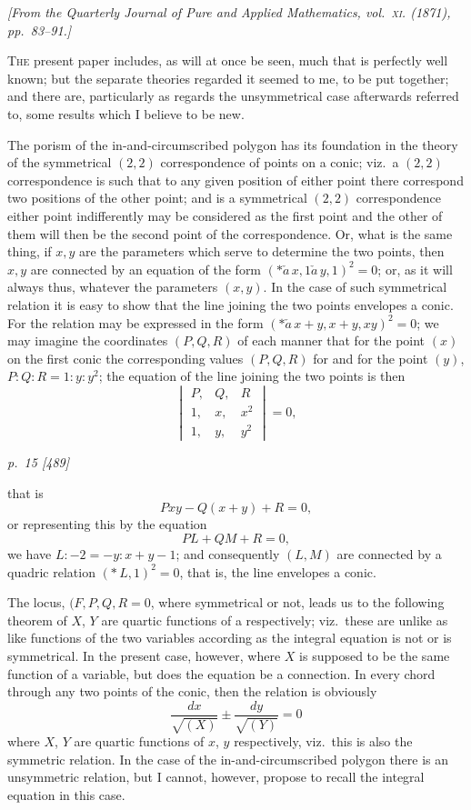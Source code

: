 \documentclass[11pt,a4paper]{article}
\theoremstyle{plain}
\theoremstyle{definition}
\begin{document}
\begin{center}
\textit{[From the Quarterly Journal of Pure and Applied Mathematics, vol.~\textsc{xi}. (1871), pp.~83--91.]}
\end{center}

\textsc{The} present paper includes, as will at once be seen, much that is perfectly well
known; but the separate theories regarded it seemed to me, to be put together; and
there are, particularly as regards the unsymmetrical case afterwards referred to, some results which I believe to be new.

The porism of the in-and-circumscribed polygon has its foundation in the theory
of the symmetrical $(2,2)$ correspondence of points on a conic; viz.\ a $(2,2)$ correspondence is such that to any given position of either point there correspond two
positions of the other point; and is a symmetrical $(2,2)$ correspondence either point
indifferently may be considered as the first point and the other of them will then be
the second point of the correspondence.  Or, what is the same thing, if $x, y$ are the
parameters which serve to determine the two points, then $x, y$ are connected by an
equation of the form $(*\!\check{a}\,x, 1\check{a}\,y, 1)^2 = 0$; or, as it will always thus, whatever the
parameters $(x, y)$.  In the case of such symmetrical relation it is easy to show that
the line joining the two points envelopes a conic.  For the relation may be expressed
in the form $(*\!\check{a}\,x + y, x + y, xy)^2 = 0$; we may imagine the coordinates $(P, Q, R)$ of
each manner that for the point $(x)$ on the first conic the corresponding values $(P, Q, R)$ for
and for the point $(y)$, $P : Q : R = 1 : y : y^2$; the equation of the line joining the two points is then
\[
\begin{vmatrix}
P, & Q, & R \\
1, & x, & x^2 \\
1, & y, & y^2
\end{vmatrix} = 0,
\]

\clearpage

\bigskip
\textit{p.~15 [489]}
\smallskip

\noindent
that is
\[
P x y - Q (x + y) + R = 0,
\]
or representing this by the equation
\[
P L + Q M + R = 0,
\]
we have $L : -2 = -y : x + y - 1$; and consequently $(L, M)$ are connected by a quadric relation $(\ast\,L, 1)^2 = 0$, that is, the line envelopes a conic.

The locus, $(F, P, Q, R = 0$, where symmetrical or not, leads us to the following theorem of $X$, $Y$ are quartic functions of a respectively; viz.\ these are unlike as like functions of the two variables according as the integral equation is not or is symmetrical.  In the present case, however, where $X$ is supposed to be the same function of a variable, but does the equation be a connection.  In every chord through any
two points of the conic, then the relation is obviously
\[
\frac{dx}{\sqrt{(X) }} \pm \frac{dy}{\sqrt{(Y)}} = 0
\]
where $X$, $Y$ are quartic functions of $x$, $y$ respectively, viz.\ this is also the symmetric relation.  In the case of the in-and-circumscribed polygon there is an unsymmetric relation, but I cannot, however, propose to recall the integral equation in this case.
\end{document}
